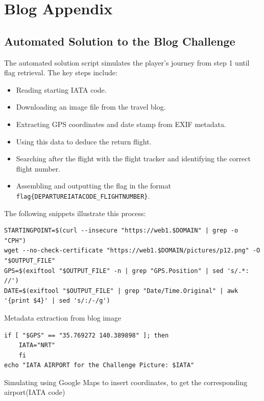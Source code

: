 \section{Blog Appendix}

\subsection{Automated Solution to the Blog Challenge}\label{SolutionBlog}

The automated solution script simulates the player’s journey from step 1 until flag retrieval. The key steps include:

\begin{itemize}
    \item Reading starting IATA code.
    \item Downloading an image file from the travel blog.
    \item Extracting GPS coordinates and date stamp from EXIF metadata.
    \item Using this data to deduce the return flight.
    \item Searching after the flight with the flight tracker and identifying the correct flight number.
    \item Assembling and outputting the flag in the format \texttt{flag\{DEPARTUREIATACODE\_FLIGHTNUMBER\}}.
\end{itemize}

The following snippets illustrate this process:

\begin{verbatim}
STARTINGPOINT=$(curl --insecure "https://web1.$DOMAIN" | grep -o "CPH")
wget --no-check-certificate "https://web1.$DOMAIN/pictures/p12.png" -O "$OUTPUT_FILE"
GPS=$(exiftool "$OUTPUT_FILE" -n | grep "GPS.Position" | sed 's/.*: //')
DATE=$(exiftool "$OUTPUT_FILE" | grep "Date/Time.Original" | awk '{print $4}' | sed 's/:/-/g')
\end{verbatim}
\begin{listing}[H]
\caption{Metadata extraction from blog image}
\end{listing}

\begin{verbatim}
if [ "$GPS" == "35.769272 140.389898" ]; then 
	IATA="NRT"
	fi
echo "IATA AIRPORT for the Challenge Picture: $IATA"
\end{verbatim}
\begin{listing}[H]
\caption{Simulating using Google Maps to insert coordinates, to get the corresponding airport(IATA code)}
\end{listing}


